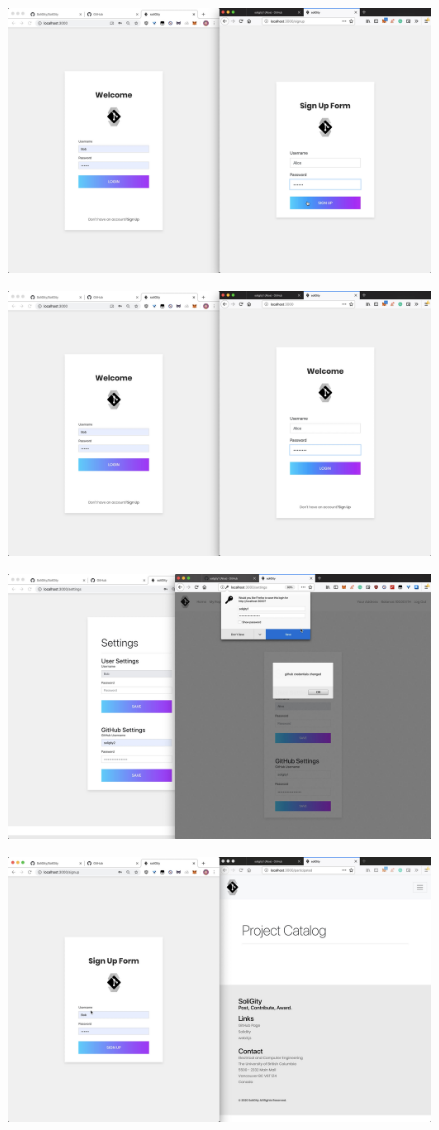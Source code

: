 \documentclass[12pt]{article}
\renewcommand{\_}{\kern-1.5pt\textunderscore\kern-1.5pt}
\begin{document}
\begin{enumerate}
	      \includegraphics[height=7cm]{graphs/15. alice_sign_up}

	      \includegraphics[height=7cm]{graphs/16. alice_login}

	      \includegraphics[height=7cm]{graphs/17. alice_gitub_setup}

	      \includegraphics[height=7cm]{graphs/18. bob_sign_up}


\end{enumerate}
\end{document}
